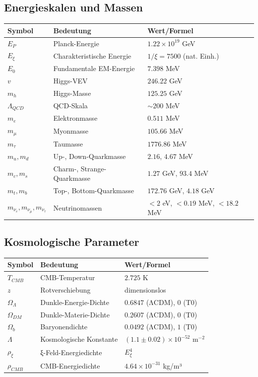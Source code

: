 \subsection{Energieskalen und Massen}
\begin{longtable}{lll}
	\toprule
	\textbf{Symbol} & \textbf{Bedeutung} & \textbf{Wert/Formel} \\
	\midrule
	$E_P$ & Planck-Energie & $1.22 \times 10^{19}$ GeV \\
	$E_\xi$ & Charakteristische Energie & $1/\xi = 7500$ (nat. Einh.) \\
	$E_0$ & Fundamentale EM-Energie & $7.398$ MeV \\
	$v$ & Higgs-VEV & $246.22$ GeV \\
	$m_h$ & Higgs-Masse & $125.25$ GeV \\
	$\Lambda_{QCD}$ & QCD-Skala & $\sim 200$ MeV \\
	$m_e$ & Elektronmasse & $0.511$ MeV \\
	$m_\mu$ & Myonmasse & $105.66$ MeV \\
	$m_\tau$ & Taumasse & $1776.86$ MeV \\
	$m_u, m_d$ & Up-, Down-Quarkmasse & $2.16$, $4.67$ MeV \\
	$m_c, m_s$ & Charm-, Strange-Quarkmasse & $1.27$ GeV, $93.4$ MeV \\
	$m_t, m_b$ & Top-, Bottom-Quarkmasse & $172.76$ GeV, $4.18$ GeV \\
	$m_{\nu_e}, m_{\nu_\mu}, m_{\nu_\tau}$ & Neutrinomassen & $< 2$ eV, $< 0.19$ MeV, $< 18.2$ MeV \\
	\bottomrule
\end{longtable}

\subsection{Kosmologische Parameter}
\begin{longtable}{lll}
	\toprule
	\textbf{Symbol} & \textbf{Bedeutung} & \textbf{Wert/Formel} \\
	\midrule
	$T_{CMB}$ & CMB-Temperatur & $2.725$ K \\
	$z$ & Rotverschiebung & dimensionslos \\
	$\Omega_\Lambda$ & Dunkle-Energie-Dichte & $0.6847$ (ΛCDM), $0$ (T0) \\
	$\Omega_{DM}$ & Dunkle-Materie-Dichte & $0.2607$ (ΛCDM), $0$ (T0) \\
	$\Omega_b$ & Baryonendichte & $0.0492$ (ΛCDM), $1$ (T0) \\
	$\Lambda$ & Kosmologische Konstante & $(1.1 \pm 0.02) \times 10^{-52}$ m$^{-2}$ \\
	$\rho_\xi$ & ξ-Feld-Energiedichte & $E_\xi^4$ \\
	$\rho_{CMB}$ & CMB-Energiedichte & $4.64 \times 10^{-31}$ kg/m³ \\
	\bottomrule
\end{longtable}

